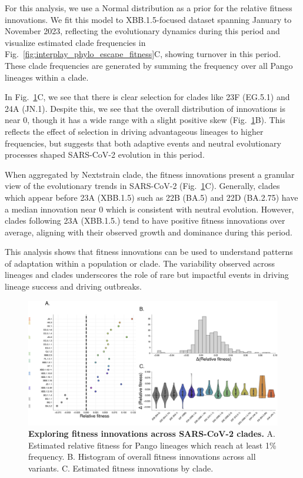 For this analysis, we use a Normal distribution as a prior for the relative fitness innovations.
We fit this model to XBB.1.5-focused dataset spanning January to November 2023, reflecting the evolutionary dynamics during this period and visualize estimated clade frequencies in Fig.~\ref{fig:interplay_phylo_escape_fitness}C, showing turnover in this period.
These clade frequencies are generated by summing the frequency over all Pango lineages within a clade.

In Fig.~\ref{fig:exploring-fitness-innovations}C, we see that there is clear selection for clades like 23F (EG.5.1) and 24A (JN.1).
Despite this, we see that the overall distribution of innovations is near 0, though it has a wide range with a slight positive skew (Fig.~\ref{fig:exploring-fitness-innovations}B).
This reflects the effect of selection in driving advantageous lineages to higher frequencies, but suggests that both adaptive events and neutral evolutionary processes shaped SARS-CoV-2 evolution in this period.

When aggregated by Nextstrain clade, the fitness innovations present a granular view of the evolutionary trends in SARS-CoV-2 (Fig.~\ref{fig:exploring-fitness-innovations}C).
Generally, clades which appear before 23A (XBB.1.5) such as 22B (BA.5) and 22D (BA.2.75) have a median innovation near 0 which is consistent with neutral evolution.
However, clades following 23A (XBB.1.5.) tend to have positive fitness innovations over average, aligning with their observed growth and dominance during this period. 

This analysis shows that fitness innovations can be used to understand patterns of adaptation within a population or clade.
The variability observed across lineages and clades underscores the role of rare but impactful events in driving lineage success and driving outbreaks.

\begin{figure}[h]
	\centering
	\includegraphics[width=1.0\textwidth]{./figures/exploring-fitness-innovations.png}
	\caption{\textbf{Exploring fitness innovations across SARS-CoV-2 clades.}
	    A. Estimated relative fitness for Pango lineages which reach at least 1\% frequency.
	    B. Histogram of overall fitness innovations across all variants.
	    C. Estimated fitness innovations by clade.
	}
	\label{fig:exploring-fitness-innovations}
\end{figure}

